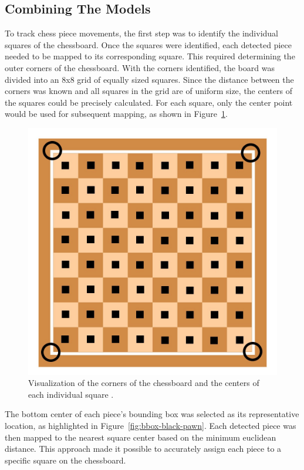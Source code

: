 

\subsection{Combining The Models}

To track chess piece movements, the first step was to identify the individual squares of the chessboard. Once the squares were identified, each detected piece needed to be mapped to its corresponding square. This required determining the outer corners of the chessboard. With the corners identified, the board was divided into an 8x8 grid of equally sized squares. Since the distance between the corners was known and all squares in the grid are of uniform size, the centers of the squares could be precisely calculated. For each square, only the center point would be used for subsequent mapping, as shown in Figure~\ref{fig:chessboard-centers}.



\begin{figure}[h!]
    \centering
    \includegraphics[width=0.75\linewidth]{figures/methods/ml-models/outer_corners_centers_chessboard.jpg}
    \caption[Chessboard corners and centers]{Visualization of the corners of the chessboard and the centers of each individual square \cite{vectorstock:chessboard-svg}.}
    \label{fig:chessboard-centers}
\end{figure}


The bottom center of each piece’s bounding box was selected as its representative location, as highlighted in Figure~\ref{fig:bbox-black-pawn}. Each detected piece was then mapped to the nearest square center based on the minimum euclidean distance.  This approach made it possible to accurately assign each piece to a specific square on the chessboard.


